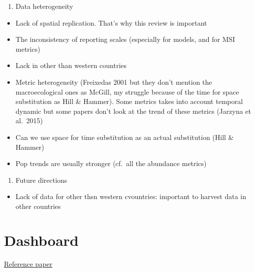 \documentclass[
  12pt,
  oneside]{report}
\providecommand{\tightlist}{%
  \setlength{\itemsep}{0pt}\setlength{\parskip}{0pt}}
\begin{document}
\begin{enumerate}
\def\labelenumi{\arabic{enumi})}
\setcounter{enumi}{1}
\tightlist
\item
  Data heterogeneity
\end{enumerate}

\begin{itemize}
\item
  Lack of spatial replication. That's why this review is important
\item
  The inconsistency of reporting scales (especially for models, and for MSI metrics)
\item
  Lack in other than western countries
\item
  Metric heterogeneity (Freixedas 2001 but they don't mention the macroecological ones as McGill, my struggle because of the time for space substitution as Hill \& Hammer). Some metrics takes into account temporal dynamic but some papers don't look at the trend of these metrics (Jarzyna et al.~2015)
\item
  Can we use space for time substitution as an actual substitution (Hill \& Hammer)
\item
  Pop trends are usually stronger (cf.~all the abundance metrics)
\end{itemize}

\begin{enumerate}
\def\labelenumi{\arabic{enumi})}
\setcounter{enumi}{2}
\tightlist
\item
  Future directions
\end{enumerate}

\begin{itemize}
\tightlist
\item
  Lack of data for other thsn western cvountries: important to harvest data in other countries
\end{itemize}

\hypertarget{dashboard}{%
\chapter*{Dashboard}\label{dashboard}}

\href{https://www.sciencedirect.com/science/article/pii/S1470160X20306658?via\%3Dihub}{Reference paper}
\end{document}
